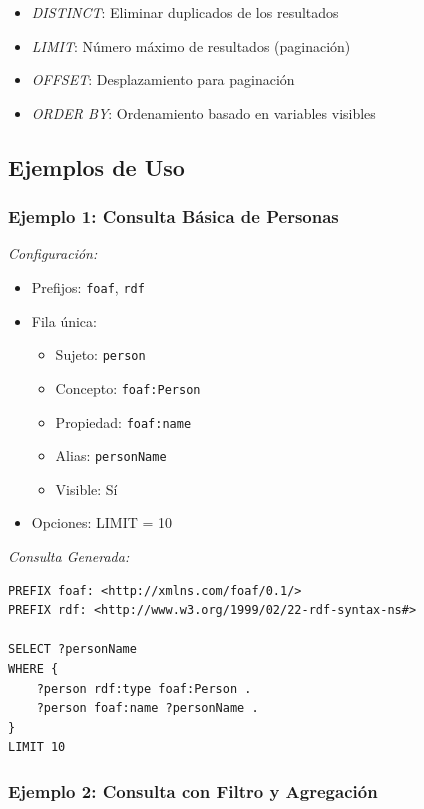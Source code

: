\documentclass{article}
\begin{document}
\begin{itemize}
    \item \textit{DISTINCT}: Eliminar duplicados de los resultados
    \item \textit{LIMIT}: Número máximo de resultados (paginación)
    \item \textit{OFFSET}: Desplazamiento para paginación
    \item \textit{ORDER BY}: Ordenamiento basado en variables visibles
\end{itemize}

\subsection{Ejemplos de Uso}
\label{subsec:sparql-examples}

\subsubsection{Ejemplo 1: Consulta Básica de Personas}
\label{subsubsec:example-basic}

\textit{Configuración:}
\begin{itemize}
    \item Prefijos: \texttt{foaf}, \texttt{rdf}
    \item Fila única: 
    \begin{itemize}
        \item Sujeto: \texttt{person}
        \item Concepto: \texttt{foaf:Person}
        \item Propiedad: \texttt{foaf:name}
        \item Alias: \texttt{personName}
        \item Visible: Sí
    \end{itemize}
    \item Opciones: LIMIT = 10
\end{itemize}

\textit{Consulta Generada:}
\begin{verbatim}
PREFIX foaf: <http://xmlns.com/foaf/0.1/>
PREFIX rdf: <http://www.w3.org/1999/02/22-rdf-syntax-ns#>

SELECT ?personName
WHERE {
    ?person rdf:type foaf:Person .
    ?person foaf:name ?personName .
}
LIMIT 10
\end{verbatim}

\subsubsection{Ejemplo 2: Consulta con Filtro y Agregación}
\label{subsubsec:example-aggregation}
\end{document}
